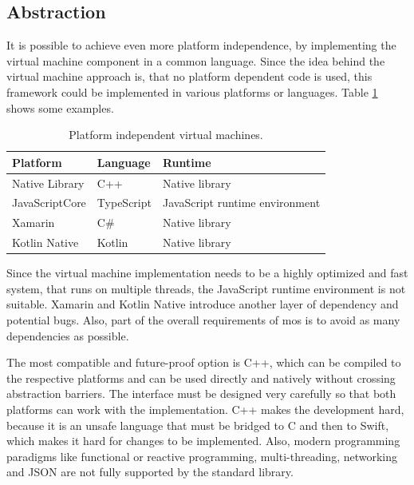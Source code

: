 \subsection{Abstraction}

It is possible to achieve even more platform independence, by implementing the virtual machine component in a common language.
Since the idea behind the virtual machine approach is, that no platform dependent code is used, this framework could be implemented in various platforms or languages.
Table \ref{table:platformindependentabstraction} shows some examples.

\begin{table}[h]
	\begin{center}
		\begin{tabular}{l|l|l}
			Platform       & Language   & Runtime                    \\ \hline
			Native Library & C++        & Native library                 \\
			JavaScriptCore & TypeScript & JavaScript runtime environment \\
			Xamarin        & C\#        & Native library                 \\
			Kotlin Native  & Kotlin     & Native library                
		\end{tabular}
	\end{center}
	\caption{Platform independent virtual machines.}
	\label{table:platformindependentabstraction}
\end{table}

Since the virtual machine implementation needs to be a highly optimized and fast system, that runs on multiple threads, the JavaScript runtime environment is not suitable.
Xamarin and Kotlin Native introduce another layer of dependency and potential bugs.
Also, part of the overall requirements of mos is to avoid as many dependencies as possible.

The most compatible and future-proof option is C++, which can be compiled to the respective platforms and can be used directly and natively without crossing abstraction barriers.
The interface must be designed very carefully so that both platforms can work with the implementation.
C++ makes the development hard, because it is an unsafe language that must be bridged to C and then to Swift, which makes it hard for changes to be implemented.
Also, modern programming paradigms like functional or reactive programming, multi-threading, networking and JSON are not fully supported by the standard library.

